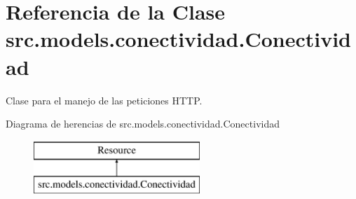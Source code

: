\hypertarget{classsrc_1_1models_1_1conectividad_1_1_conectividad}{\section{Referencia de la Clase src.\-models.\-conectividad.\-Conectividad}
\label{classsrc_1_1models_1_1conectividad_1_1_conectividad}
}


Clase para el manejo de las peticiones H\-T\-T\-P.  


Diagrama de herencias de src.\-models.\-conectividad.\-Conectividad\begin{figure}[H]
\begin{center}
\leavevmode
\includegraphics[height=2.000000cm]{classsrc_1_1models_1_1conectividad_1_1_conectividad}
\end{center}
\end{figure}
